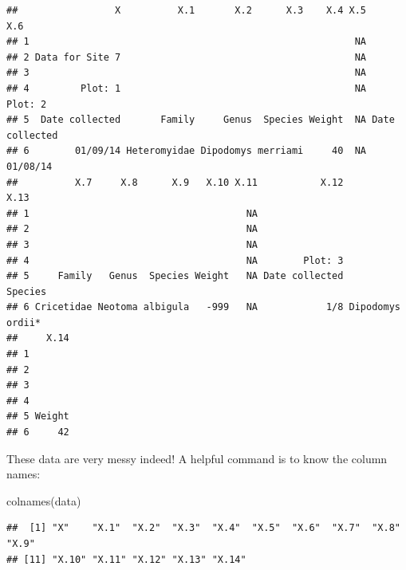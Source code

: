 \documentclass[
]{book}
\newenvironment{Shaded}{\begin{snugshade}}{\end{snugshade}}
\newcommand{\AttributeTok}[1]{\textcolor[rgb]{0.77,0.63,0.00}{#1}}
\newcommand{\CommentTok}[1]{\textcolor[rgb]{0.56,0.35,0.01}{\textit{#1}}}
\newcommand{\DecValTok}[1]{\textcolor[rgb]{0.00,0.00,0.81}{#1}}
\newcommand{\FunctionTok}[1]{\textcolor[rgb]{0.00,0.00,0.00}{#1}}
\newcommand{\NormalTok}[1]{#1}
\newcommand{\OtherTok}[1]{\textcolor[rgb]{0.56,0.35,0.01}{#1}}
\newcommand{\SpecialCharTok}[1]{\textcolor[rgb]{0.00,0.00,0.00}{#1}}
\newcommand{\StringTok}[1]{\textcolor[rgb]{0.31,0.60,0.02}{#1}}
\begin{document}
\begin{verbatim}
##                 X          X.1       X.2      X.3    X.4 X.5            X.6
## 1                                                         NA               
## 2 Data for Site 7                                         NA               
## 3                                                         NA               
## 4         Plot: 1                                         NA        Plot: 2
## 5  Date collected       Family     Genus  Species Weight  NA Date collected
## 6        01/09/14 Heteromyidae Dipodomys merriami     40  NA       01/08/14
##          X.7     X.8      X.9   X.10 X.11           X.12             X.13
## 1                                      NA                                
## 2                                      NA                                
## 3                                      NA                                
## 4                                      NA        Plot: 3                 
## 5     Family   Genus  Species Weight   NA Date collected          Species
## 6 Cricetidae Neotoma albigula   -999   NA            1/8 Dipodomys ordii*
##     X.14
## 1       
## 2       
## 3       
## 4       
## 5 Weight
## 6     42
\end{verbatim}

These data are very messy indeed! A helpful command is to know the column names:

\begin{Shaded}
\begin{Highlighting}[]
\FunctionTok{colnames}\NormalTok{(data)}
\end{Highlighting}
\end{Shaded}

\begin{verbatim}
##  [1] "X"    "X.1"  "X.2"  "X.3"  "X.4"  "X.5"  "X.6"  "X.7"  "X.8"  "X.9" 
## [11] "X.10" "X.11" "X.12" "X.13" "X.14"
\end{verbatim}

\begin{Shaded}
\end{Shaded}
\end{document}
